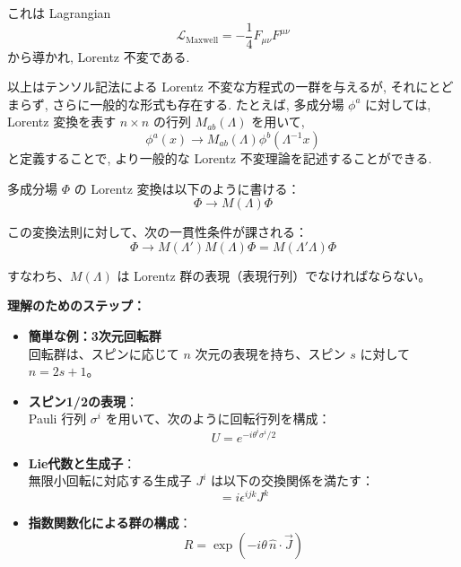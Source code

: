 \documentclass[a4paper,12pt]{article}
\begin{document}
これは Lagrangian
\begin{equation*}
\mathcal{L}_\text{Maxwell} = -\frac{1}{4} F_{\mu\nu} F^{\mu\nu} \tag{3.7}
\end{equation*}
から導かれ, Lorentz 不変である.

以上はテンソル記法による Lorentz 不変な方程式の一群を与えるが, それにとどまらず, さらに一般的な形式も存在する. たとえば, 多成分場 $\phi^a$ に対しては, Lorentz 変換を表す $n \times n$ の行列 $M_{ab}(\Lambda)$ を用いて,
\begin{equation*}
\phi^a(x) \to M_{ab}(\Lambda) \phi^b(\Lambda^{-1}x) \tag{3.8}
\end{equation*}
と定義することで, より一般的な Lorentz 不変理論を記述することができる.


多成分場 $\Phi$ の Lorentz 変換は以下のように書ける：
\begin{equation*}
\Phi \rightarrow M(\Lambda)\Phi \tag{3.9}
\end{equation*}

この変換法則に対して、次の一貫性条件が課される：
\begin{equation*}
\Phi \rightarrow M(\Lambda')M(\Lambda)\Phi = M(\Lambda'\Lambda)\Phi \tag{3.10}
\end{equation*}

すなわち、$M(\Lambda)$ は Lorentz 群の表現（表現行列）でなければならない。

\vspace{1em}
\textbf{理解のためのステップ：}

\begin{itemize}
  \item \textbf{簡単な例：3次元回転群} \\
  回転群は、スピンに応じて $n$ 次元の表現を持ち、スピン $s$ に対して $n = 2s + 1$。
  \item \textbf{スピン1/2の表現}：\\
  Pauli 行列 $\sigma^i$ を用いて、次のように回転行列を構成：
  \begin{equation*}
  U = e^{-i\theta^i \sigma^i/2} \tag{3.11}
  \end{equation*}
  \item \textbf{Lie代数と生成子}：\\
  無限小回転に対応する生成子 $J^i$ は以下の交換関係を満たす：
  \begin{equation*}
  [J^i, J^j] = i\epsilon^{ijk}J^k \tag{3.12}
  \end{equation*}
  \item \textbf{指数関数化による群の構成}：
  \begin{equation*}
  R = \exp(-i\theta\, \hat{n} \cdot \vec{J}) \tag{3.13}
  \end{equation*}
\end{itemize}
\end{document}
